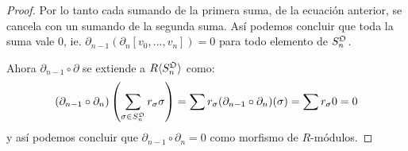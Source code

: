 \begin{proof}
	Por lo tanto cada sumando de la primera suma, de la ecuaci\'on anterior, se cancela con un sumando de la segunda
	suma. As\'i podemos concluir que toda la suma vale 0, ie. $\partial_{n-1}(\partial_n[v_0,\ldots,v_n])=0$ para todo
	elemento de $S_n^{\mathfrak{O}}$.

	Ahora $\partial_{n-1}\circ\partial$ se extiende a $R\langle S_n^{\mathfrak{O}} \rangle$ como:
	\[
		(\partial_{n-1}\circ\partial_n)\left( \sum_{\sigma\in S_n^{\mathfrak{O}}} r_{\sigma}\sigma \right)=
		\sum r_{\sigma} (\partial_{n-1}\circ\partial_n)(\sigma)=
		\sum r_{\sigma} 0=0
	\]
	y as\'i podemos concluir que $\partial_{n-1}\circ\partial_n=0$ como morfismo de $R$-m\'odulos.
\end{proof}%

